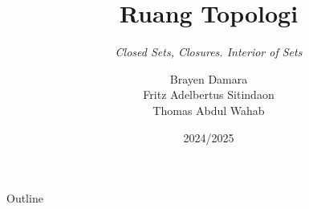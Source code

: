 \documentclass{beamer}
\title{Ruang Topologi}
\subtitle{\textit{Closed Sets, Closures. Interior of Sets}}
\date[]{2024/2025}
\author[Brayen, Fritz, Wahab]{Brayen Damara\\Fritz Adelbertus Sitindaon\\Thomas Abdul Wahab}
\begin{document}
\begin{frame}
\titlepage
\end{frame}

\begin{frame}{Outline}
    \tableofcontents
\end{frame}






\end{document}

